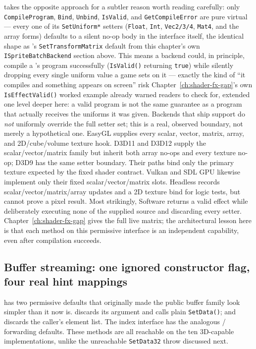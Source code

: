  takes the opposite approach for a subtler reason worth reading
carefully: only \texttt{CompileProgram}, \texttt{Bind}, \texttt{Unbind}, \texttt{IsValid}, and
\texttt{GetCompileError} are pure virtual --- every one of its \texttt{SetUniform*} setters
(\texttt{Float}, \texttt{Int}, \texttt{Vec2/3/4}, \texttt{Mat4}, and the array forms) defaults
to a silent no-op body in the interface itself, the identical shape as
's \texttt{SetTransformMatrix} default from this chapter's own
\texttt{ISpriteBatchBackend} section above. This means a backend could, in
principle, compile a 's program successfully (\texttt{IsValid()}
returning \texttt{true}) while silently dropping every single uniform value a game sets on it
--- exactly the kind of ``it compiles and something appears on screen'' risk
Chapter~\ref{ch:shader-fx-gap}'s own \texttt{IsEffectValid()} worked example already warned
readers to check for, extended one level deeper here: a valid program is not the same
guarantee as a program that actually receives the uniforms it was given. Backends that ship
 support do \emph{not} uniformly override the full setter set; this is a
real, observed boundary, not merely a hypothetical one. EasyGL supplies every
scalar, vector, matrix, array, and 2D/cube/volume texture hook. D3D11 and D3D12 supply the
scalar/vector/matrix family but inherit both array no-ops and every texture no-op; D3D9 has
the same setter boundary. Their  paths bind only the primary texture
expected by the fixed shader contract. Vulkan and SDL GPU likewise implement only their fixed
scalar/vector/matrix slots. Headless records scalar/vector/matrix/array updates and a 2D
texture bind for logic tests, but cannot prove a pixel result. Most strikingly, Software
returns a valid effect while deliberately executing none of the supplied source and
discarding every setter. Chapter~\ref{ch:shader-fx-gap} gives the full live matrix; the
architectural lesson here is that each method on this permissive interface is an independent
capability, even after compilation succeeds.

\subsection{Buffer streaming: one ignored constructor flag, four real hint mappings}

 has two permissive defaults that originally made the public
buffer family look simpler than it now is.  discards its
 argument and calls plain \texttt{SetData()}; and
 discards the caller's element list. The index interface has
the analogous  /  forwarding
defaults. These methods are all reachable on the ten 3D-capable implementations, unlike the
unreachable \texttt{SetData32} throw discussed next.

